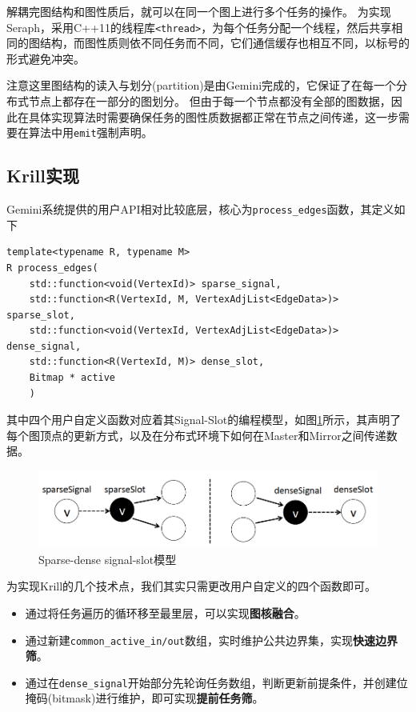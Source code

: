 \documentclass[logo,reportComp]{thesis}
\begin{document}
解耦完图结构和图性质后，就可以在同一个图上进行多个任务的操作。
为实现Seraph，采用C++11的线程库\verb'<thread>'，为每个任务分配一个线程，然后共享相同的图结构，而图性质则依不同任务而不同，它们通信缓存也相互不同，以标号的形式避免冲突。

注意这里图结构的读入与划分(partition)是由Gemini完成的，它保证了在每一个分布式节点上都存在一部分的图划分。
但由于每一个节点都没有全部的图数据，因此在具体实现算法时需要确保任务的图性质数据都正常在节点之间传递，这一步需要在算法中用\verb'emit'强制声明。

\subsection{Krill实现}
Gemini系统提供的用户API相对比较底层，核心为\verb'process_edges'函数，其定义如下
\begin{lstlisting}
template<typename R, typename M>
R process_edges(
	std::function<void(VertexId)> sparse_signal,
	std::function<R(VertexId, M, VertexAdjList<EdgeData>)> sparse_slot,
	std::function<void(VertexId, VertexAdjList<EdgeData>)> dense_signal,
	std::function<R(VertexId, M)> dense_slot,
	Bitmap * active
	)
\end{lstlisting}

其中四个用户自定义函数对应着其Signal-Slot的编程模型，如图\ref{fig:signal-slot}所示，其声明了每个图顶点的更新方式，以及在分布式环境下如何在Master和Mirror之间传递数据。
\begin{figure}[H]
\centering
\includegraphics[width=0.8\linewidth]{fig/signal-slot.png}
\caption{Sparse-dense signal-slot模型}
\label{fig:signal-slot}
\end{figure}

为实现Krill的几个技术点，我们其实只需更改用户自定义的四个函数即可。
\begin{itemize}
\item 通过将任务遍历的循环移至最里层，可以实现\textbf{图核融合}。
\item 通过新建\verb'common_active_in/out'数组，实时维护公共边界集，实现\textbf{快速边界筛}。
\item 通过在\verb'dense_signal'开始部分先轮询任务数组，判断更新前提条件，并创建位掩码(bitmask)进行维护，即可实现\textbf{提前任务筛}。
\end{itemize}
\end{document}
